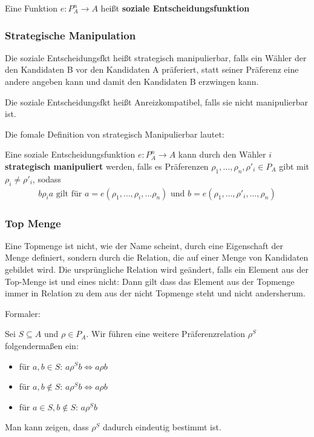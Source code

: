 \documentclass[]{article}
\begin{document}
  Eine Funktion $ e : P_A^n \to A$  heißt \textbf{soziale Entscheidungsfunktion}


\subsubsection*{Strategische Manipulation}
 Die soziale Entscheidungsfkt heißt strategisch manipulierbar, falls ein Wähler der den Kandidaten B vor den Kandidaten A präferiert, statt seiner Präferenz eine andere angeben kann und damit den Kandidaten B erzwingen kann. 
 
 Die soziale Entscheidungsfkt heißt Anreizkompatibel, falls sie nicht manipulierbar ist. 
 
 Die fomale Definition von strategisch Manipulierbar lautet: 

 Eine soziale Entscheidungsfunktion $e : P_A^n \to A$ kann durch den Wähler $i$ \textbf{strategisch manipuliert} werden, falls es Präferenzen $\rho_1, \dots, \rho_n, \rho'_i \in P_A$ gibt mit $\rho_i \neq \rho'_i$, sodass
 \begin{align*}
 b \rho_i a \text{ gilt für }  a = e(\rho_1, \dots, \rho_i, \dots \rho_n) \text{ und } b= e(\rho_1, \dots, \rho'_i, \dots, \rho_n)
 \end{align*}
 
\subsubsection*{Top Menge} 
Eine Topmenge ist nicht, wie der Name scheint, durch eine Eigenschaft der Menge definiert, sondern durch die Relation, die auf einer Menge von Kandidaten gebildet wird. Die ursprüngliche Relation wird geändert, falls ein Element aus der Top-Menge ist und eines nicht: Dann gilt dass das Element aus der Topmenge immer in Relation zu dem aus der nicht Topmenge steht und nicht andersherum. 

Formaler:

Sei $S \subseteq A$ und $\rho \in P_A$. Wir führen eine weitere Präferenzrelation $\rho^S$ folgendermaßen ein:
\begin{itemize}
	\item für $a,b \in S$: $a \rho^S b \Leftrightarrow a \rho b$
	\item für $a,b \notin S$: $a \rho^S b \Leftrightarrow a \rho b$
	\item für $a \in S, b \notin S$: $a \rho^S b$
\end{itemize}
Man kann zeigen, dass $\rho^S$ dadurch eindeutig bestimmt ist.
\end{document}
